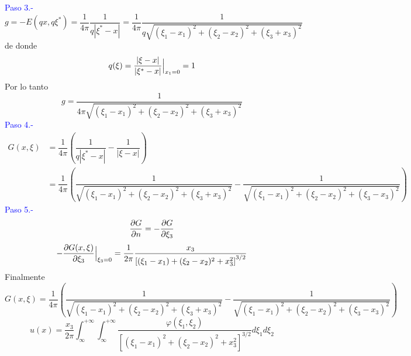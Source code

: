 \documentclass[../main]{subfiles}
\begin{document}
    \textcolor{blue}{Paso 3.-}
    \begin{equation}
        g=-E(qx,q\xi^*)=\dfrac{1}{4\pi}\dfrac{1}{q|\xi^*-x|}=\dfrac{1}{4\pi}\dfrac{1}{q\sqrt{(\xi_1-x_1)^2+(\xi_2-x_2)^2+(\xi_3+x_3)^2}}
    \end{equation}
    de donde
    \begin{equation}
        q(\xi)=\dfrac{|\xi-x|}{|\xi^*-x|}\Big{|}_{x_1=0}=1
    \end{equation}
    Por lo tanto
    \begin{equation}
        g=\dfrac{1}{4\pi\sqrt{(\xi_1-x_1)^2+(\xi_2-x_2)^2+(\xi_3+x_3)^2}}
    \end{equation}
    \textcolor{blue}{Paso 4.-}
    \begin{align}
        G(x,\xi)&=\dfrac{1}{4\pi}\left(\dfrac{1}{q|\xi^*-x|}-\dfrac{1}{|\xi-x|}\right)\\
        &=\dfrac{1}{4\pi}\left( \dfrac{1}{\sqrt{(\xi_1-x_1)^2+(\xi_2-x_2)^2+(\xi_3+x_3)^2}}-\dfrac{1}{\sqrt{(\xi_1-x_1)^2+(\xi_2-x_2)^2+(\xi_3-x_3)^2}} \right)
    \end{align}
    \textcolor{blue}{Paso 5.-}
    $$\pdv{G}{n}=-\pdv{G}{\xi_3}$$
    \begin{equation}
        -\pdv{G(x,\xi)}{\xi_3}\Big{|}_{\xi_3=0}=\dfrac{1}{2\pi}\dfrac{x_3}{\left[ (\xi_1-x_1)+(\xi_2-x_2)^2+x_3^2\right]^{3/2}}
    \end{equation}
    Finalmente
    \begin{equation}
        G(x,\xi)=\dfrac{1}{4\pi}\left(\dfrac{1}{\sqrt{(\xi_1-x_1)^2+(\xi_2-x_2)^2+(\xi_3+x_3)^2}}-\dfrac{1}{\sqrt{(\xi_1-x_1)^2+(\xi_2-x_2)^2+(\xi_3-x_3)^2}}\right)
    \end{equation}
    \begin{equation}
        u(x)=\dfrac{x_3}{2\pi}\int_{\infty}^{+\infty}\int_{\infty}^{+\infty} \dfrac{\varphi(\xi_1,\xi_2)}{[(\xi_1-x_1)^2+(\xi_2-x_2)^2+x_3^2]^{3/2}} d\xi_1 d\xi_2
    \end{equation}
\end{document}
